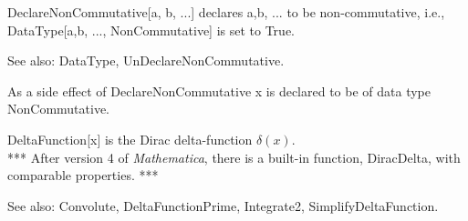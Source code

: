 

DeclareNonCommutative[a, b, ...] declares a,b, ... to be non-commutative, i.e., DataType[a,b, ..., NonCommutative] is set to True.

See also:  DataType, UnDeclareNonCommutative.



As a side effect of DeclareNonCommutative x is declared to be of data type NonCommutative.











 DeltaFunction[x] is the Dirac delta-function \(\delta (x)\).\\
*** After version 4 of {\itshape Mathematica}, there is a built-in function, DiracDelta, with comparable properties. ***

See also:  Convolute, DeltaFunctionPrime, Integrate2, SimplifyDeltaFunction.







